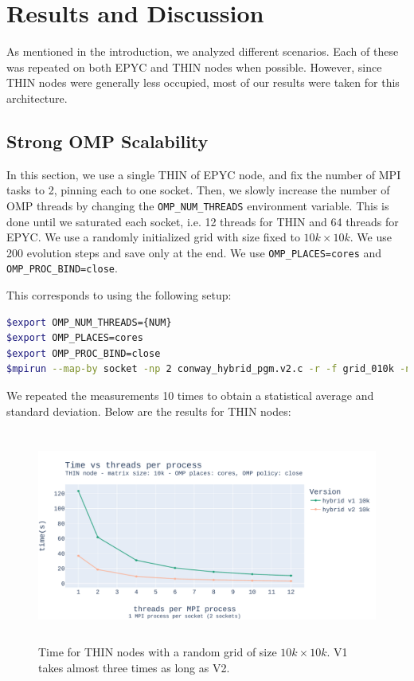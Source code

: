 \documentclass{report}
\begin{document}
\section{Results and Discussion}

As mentioned in the introduction, we analyzed different scenarios. 
Each of these was repeated on both EPYC and THIN nodes when possible. 
However, since THIN nodes were generally less occupied, most of our 
results were taken for this architecture. 

\subsection{Strong OMP Scalability}

In this section, we use a single THIN of EPYC node, and fix the number of MPI 
tasks to 2, pinning each to one socket. Then, we slowly increase the 
number of OMP threads by changing the \texttt{OMP\_NUM\_THREADS} environment 
variable. This is done until we saturated each socket, i.e. 12 threads for THIN 
and 64 threads for EPYC. We use a randomly initialized grid with size fixed to 
$10k \times 10k$. We use 200 evolution steps and save only at the end. 
We use \texttt{OMP\_PLACES=cores} and \texttt{OMP\_PROC\_BIND=close}.

This corresponds to using the following setup:  

\begin{lstlisting}[language=bash]
$export OMP_NUM_THREADS={NUM}
$export OMP_PLACES=cores
$export OMP_PROC_BIND=close
$mpirun --map-by socket -np 2 conway_hybrid_pgm.v2.c -r -f grid_010k -n 200 -s 0 -e 1
\end{lstlisting}

We repeated the measurements 10 times to obtain a statistical average and standard 
deviation. Below are the results for THIN nodes:

\begin{figure}[H]
\centering
\includegraphics[width=14cm, height=7cm]{./images/strong_OMP_thin_hybrid_grid_010k.pdf}
\caption{\label{fig:strongomp10kspeedupthin} Time for THIN nodes with a 
random grid of size $10k \times 10k$. V1 takes almost three times as long as V2.}
\end{figure}
\end{document}
